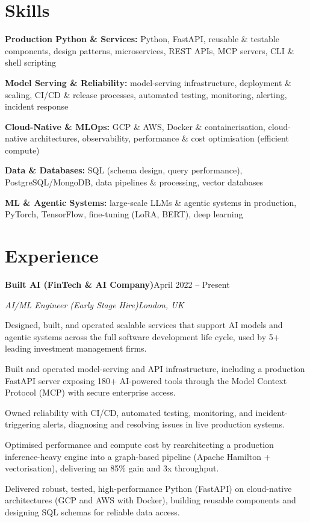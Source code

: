 \documentclass[10pt,a4paper]{article}
\newcommand{\entry}[4]{%
  {\color{company}\bfseries #1}\hfill {\color{muted}#2}\par
  \vspace{1pt}
  {\itshape #3}\hfill {\color{muted}\itshape #4}\par
  \vspace{3pt}%
}
\begin{document}
\section{Skills}
\begin{tight}
  \item[\textcolor{accent}{\small$\bullet$}] \textbf{Production Python \& Services:} Python, FastAPI, reusable \& testable components, design patterns, microservices, REST APIs, MCP servers, CLI \& shell scripting
  \item[\textcolor{accent}{\small$\bullet$}] \textbf{Model Serving \& Reliability:} model-serving infrastructure, deployment \& scaling, CI/CD \& release processes, automated testing, monitoring, alerting, incident response
  \item[\textcolor{accent}{\small$\bullet$}] \textbf{Cloud-Native \& MLOps:} GCP \& AWS, Docker \& containerisation, cloud-native architectures, observability, performance \& cost optimisation (efficient compute)
  \item[\textcolor{accent}{\small$\bullet$}] \textbf{Data \& Databases:} SQL (schema design, query performance), PostgreSQL/MongoDB, data pipelines \& processing, vector databases
  \item[\textcolor{accent}{\small$\bullet$}] \textbf{ML \& Agentic Systems:} large-scale LLMs \& agentic systems in production, PyTorch, TensorFlow, fine-tuning (LoRA, BERT), deep learning
\end{tight}

\section{Experience}
\entry{Built AI (FinTech \& AI Company)}{April 2022 -- Present}{AI/ML Engineer (Early Stage Hire)}{London, UK}
\begin{tight}
  \item Designed, built, and operated scalable services that support AI models and agentic systems across the full software development life cycle, used by 5+ leading investment management firms.
  \item Built and operated model-serving and API infrastructure, including a production FastAPI server exposing 180+ AI-powered tools through the Model Context Protocol (MCP) with secure enterprise access.
  \item Owned reliability with CI/CD, automated testing, monitoring, and incident-triggering alerts, diagnosing and resolving issues in live production systems.
  \item Optimised performance and compute cost by rearchitecting a production inference-heavy engine into a graph-based pipeline (Apache Hamilton + vectorisation), delivering an 85\% gain and 3x throughput.
  \item Delivered robust, tested, high-performance Python (FastAPI) on cloud-native architectures (GCP and AWS with Docker), building reusable components and designing SQL schemas for reliable data access.
\end{tight}
\end{document}
